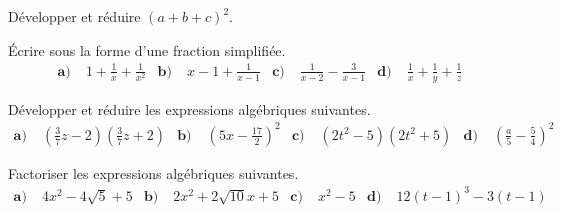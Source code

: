 \documentclass[11pt]{article}
\begin{document}
\begin{exo}
Développer et réduire $(a+b+c)^2$.
\end{exo}

\begin{exo}
Écrire sous la forme d'une fraction simplifiée.
\begin{align*}
  \textbf{a)}\;& 1+\frac{1}{x}+\frac{1}{x^2} &
  \textbf{b)}\;& x-1+\frac{1}{x-1} &
  \textbf{c)}\;& \frac{1}{x-2}-\frac{3}{x-1} &
  \textbf{d)}\;& \frac{1}{x}+\frac{1}{y}+\frac{1}{z}
\end{align*}
\end{exo}

\begin{exo}
Développer et réduire les expressions algébriques suivantes.
\begin{align*}
  \textbf{a)}\;& \left( \frac{3}{7}z-2 \right)\left( \frac{3}{7}z+2 \right) &
  \textbf{b)}\;& \left( 5x-\frac{17}{2} \right)^2 &
  \textbf{c)}\;& (2t^2-5)(2t^2+5) &
  \textbf{d)}\;& \left( \frac{a}{5}-\frac{5}{4} \right)^2
\end{align*}
\end{exo}

\begin{exo}
Factoriser les expressions algébriques suivantes.
\begin{align*}
  \textbf{a)}\;& 4x^2-4\sqrt5+5 &
  \textbf{b)}\;& 2x^2+2\sqrt{10}x+5 &
  \textbf{c)}\;& x^2-5 &
  \textbf{d)}\;& 12(t-1)^3-3(t-1)
\end{align*}
\end{exo}
\end{document}

